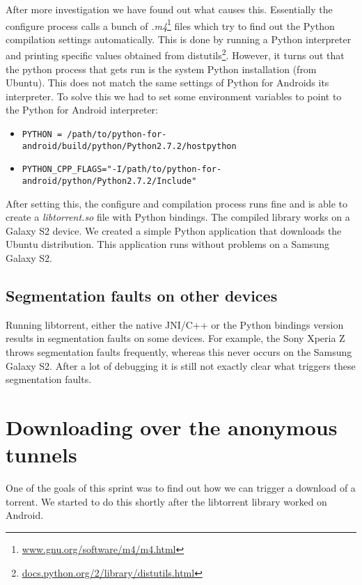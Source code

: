 			After more investigation we have found out what causes this. Essentially the configure process calls a bunch of \emph{.m4}\footnote{\href{https://www.gnu.org/software/m4/m4.html}{www.gnu.org/software/m4/m4.html}} files which try to find out the Python compilation settings automatically. This is done by running a Python interpreter and printing specific values obtained from distutils\footnote{\href{https://docs.python.org/2/library/distutils.html}{docs.python.org/2/library/distutils.html}}. However, it turns out that the python process that gets run is the system Python installation (from Ubuntu). This does not match the same settings of Python for Androids its interpreter. To solve this we had to set some environment variables to point to the Python for Android interpreter:
			
			\begin{itemize}
				\item \texttt{PYTHON = /path/to/python-for-android/build/python/Python2.7.2/hostpython}
				\item \texttt{PYTHON\_CPP\_FLAGS="-I/path/to/python-for-android/python/Python2.7.2/Include"}
			\end{itemize}
			
			After setting this, the configure and compilation process runs fine and is able to create a \emph{libtorrent.so} file with Python bindings. The compiled library works on a Galaxy S2 device. We created a simple Python application that downloads the Ubuntu distribution. This application runs without problems on a Samsung Galaxy S2.
			
		\subsection{Segmentation faults on other devices}
			Running libtorrent, either the native JNI/C++ or the Python bindings version results in segmentation faults on some devices. For example, the Sony Xperia Z throws segmentation faults frequently, whereas this never occurs on the Samsung Galaxy S2.  After a lot of debugging it is still not exactly clear what triggers these segmentation faults.
		
	\section{Downloading over the anonymous tunnels}
	One of the goals of this sprint was to find out how we can trigger a download of a torrent. We started to do this shortly after the libtorrent library worked on Android.
	
